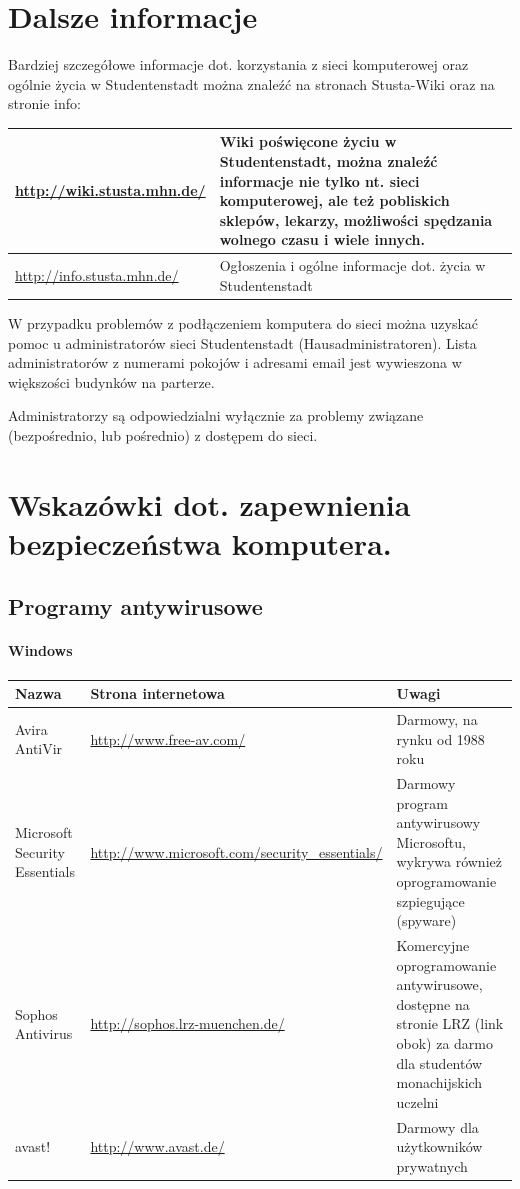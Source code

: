 \documentclass[a4paper,12pt]{scrartcl}
\begin{document}
\section*{Dalsze informacje}

Bardziej szczegółowe informacje dot. korzystania z sieci komputerowej oraz ogólnie życia w Studentenstadt można znaleźć na stronach Stusta-Wiki oraz na stronie info:

\begin{center}
  \begin{tabularx}{\linewidth}{|lX|}
    \hline
    \url{http://wiki.stusta.mhn.de/} & Wiki poświęcone życiu w Studentenstadt, można znaleźć informacje nie tylko nt. sieci komputerowej, ale też pobliskich sklepów, lekarzy, możliwości spędzania wolnego czasu i wiele innych.\\
    \hline
    \url{http://info.stusta.mhn.de/} & Ogłoszenia i ogólne informacje dot. życia w Studentenstadt\\
    \hline
  \end{tabularx}
\end{center}
W przypadku problemów z podłączeniem komputera do sieci można uzyskać pomoc u administratorów sieci Studentenstadt (Hausadministratoren). Lista administratorów z numerami pokojów i adresami email jest wywieszona w większości budynków na parterze. 

Administratorzy są odpowiedzialni wyłącznie za problemy związane (bezpośrednio, lub pośrednio) z dostępem do sieci.

\newpage
\section*{Wskazówki dot. zapewnienia bezpieczeństwa komputera.}

\subsection*{Programy antywirusowe}
\paragraph*{Windows}
\begin{center}
  \begin{tabularx}{\linewidth}{|p{.2\linewidth}XX|}
    \hline
    Nazwa & Strona internetowa & Uwagi\\
    \hline \hline
    Avira AntiVir & \url{http://www.free-av.com/} & Darmowy, na rynku od 1988 roku\\
    \hline
    Microsoft Security Essentials & \url{http://www.microsoft.com/security\_essentials/} & Darmowy program antywirusowy Microsoftu, wykrywa również oprogramowanie szpiegujące (spyware)\\
    \hline
    Sophos Antivirus & \url{http://sophos.lrz-muenchen.de/} & Komercyjne oprogramowanie antywirusowe, dostępne na stronie LRZ (link obok) za darmo dla studentów monachijskich uczelni\\
    \hline
    avast! & \url{http://www.avast.de/} & Darmowy dla użytkowników prywatnych\\
    \hline
  \end{tabularx}
\end{center}
\end{document}
